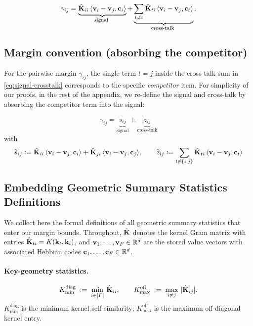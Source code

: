 \begin{equation}
\gamma_{ij}
= \underbrace{\hat{\mathbf{K}}_{ii}\,\langle {{\mathbf{v}}_{i}-{\mathbf{v}}_j}, {{\mathbf{c}}_i} \rangle}_{\text{signal }}
+ \underbrace{\sum_{t\neq i}\hat{\mathbf{K}}_{ti}\,\langle {{\mathbf{v}}_{i}-{\mathbf{v}}_j}, {{\mathbf{c}}_t} \rangle}_{\text{cross-talk }}.
\label{eq:signal-crosstalk}
\end{equation}

\subsection*{Margin convention (absorbing the competitor)}
For the pairwise margin $\gamma_{ij}$, the single term $t=j$ inside the cross-talk sum in \eqref{eq:signal-crosstalk}
corresponds to the specific \emph{competitor} item. For simplicity of our proofs, in the rest of the appendix, we re-define the signal and cross-talk by absorbing the competitor term into the signal:

\begin{equation}
\gamma_{ij} = \underbrace{\widetilde{s}_{ij}}_{\text{signal}} + \underbrace{\widetilde{z}_{ij}}_{\text{cross-talk}}
\label{eq:new-signal-crosstalk}
\end{equation}
with
\begin{equation}
    \widetilde{s}_{ij} \vcentcolon= \hat{\mathbf{K}}_{ii}\,\langle {{\mathbf{v}}_{i}-{\mathbf{v}}_j}, {{\mathbf{c}}_i} \rangle + \hat{\mathbf{K}}_{ji}\,\langle {{\mathbf{v}}_{i}-{\mathbf{v}}_j}, {{\mathbf{c}}_j} \rangle, \qquad
    \widetilde{z}_{ij} \vcentcolon= \sum_{t\notin\{i,j\}}\hat{\mathbf{K}}_{ti}\,\langle {{\mathbf{v}}_{i}-{\mathbf{v}}_j}, {{\mathbf{c}}_t} \rangle
    \label{eq:new-signal-crosstalk-sij-zij}
\end{equation}

\subsection{Embedding Geometric Summary Statistics Definitions}\label{app:emb-geo-defns}
We collect here the formal definitions of all geometric summary statistics that enter our margin bounds.
Throughout, $\hat{\mathbf{K}}$ denotes the kernel Gram matrix with entries $\hat{\mathbf{K}}_{ti} = K({\mathbf{k}}_t, {\mathbf{k}}_i)$, and ${\mathbf{v}}_1,\dots,{\mathbf{v}}_F \in \mathbb{R}^d$ are the stored value vectors with associated Hebbian codes ${\mathbf{c}}_1,\dots,{\mathbf{c}}_F \in \mathbb{R}^d$.

\paragraph{Key-geometry statistics.}

\begin{definition}\label{def:Kdiag}
\[
K_{\min}^{\mathrm{diag}} \;\vcentcolon=\; \min_{i \in [F]}\, \hat{\mathbf{K}}_{ii},
\qquad
K_{\max}^{\mathrm{off}} \;\vcentcolon=\; \max_{i \neq j}\, |\hat{\mathbf{K}}_{ij}|.
\]
$K_{\min}^{\mathrm{diag}}$ is the minimum kernel self-similarity; $K_{\max}^{\mathrm{off}}$ is the maximum off-diagonal kernel entry.
\end{definition}

